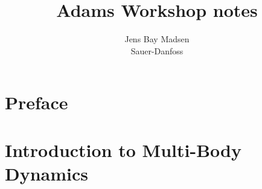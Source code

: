 

\usepackage{multirow}
	\renewcommand\multirowsetup{\centering}
\usepackage{lineno}






\title{Adams Workshop notes}
\author{Jens Bay Madsen \\ Sauer-Danfoss}






\dominitoc           %
\frontmatter
\maketitle{}
\cleardoublepage
\newpage


% 


\chapter{Preface}



\tableofcontents

\mainmatter


\chapter{Introduction to Multi-Body Dynamics}\label{chap:intro}
	\begin{minipage}[b]{.3\textwidth}
	$\,$
	\end{minipage}
	\begin{minipage}[b]{.7\textwidth}
	\minitoc
	\end{minipage}
	
	

	


\cleardoublepage
{}
%
%
{\footnotesize  }
\label{jbm_last_main_page}



% 
% 



